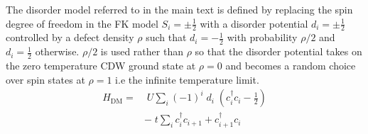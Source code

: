 The disorder model referred to in the main text is defined by replacing the spin degree of freedom in the FK model \(S_i = \pm \tfrac{1}{2}\) with a disorder potential \(d_i = \pm \tfrac{1}{2}\) controlled by a defect density \(\rho\) such that \(d_i = -\tfrac{1}{2}\) with probability \(\rho/2\) and \(d_i = \tfrac{1}{2}\) otherwise. \(\rho/2\) is used rather than \(\rho\) so that the disorder potential takes on the zero temperature CDW ground state at \(\rho = 0\) and becomes a random choice over spin states at \(\rho = 1\) i.e the infinite temperature limit. ~ \[\begin{aligned}
H_{\mathrm{DM}} = & \;U \sum_{i} (-1)^i \; d_i \;(c^\dag_{i}c_{i} - \tfrac{1}{2}) \\
& -\;t \sum_{i} c^\dag_{i}c_{i+1} + c^\dag_{i+1}c_{i} \nonumber\end{aligned}\]

\begin{Shaded}
\begin{Highlighting}[]

\end{Highlighting}
\end{Shaded}
